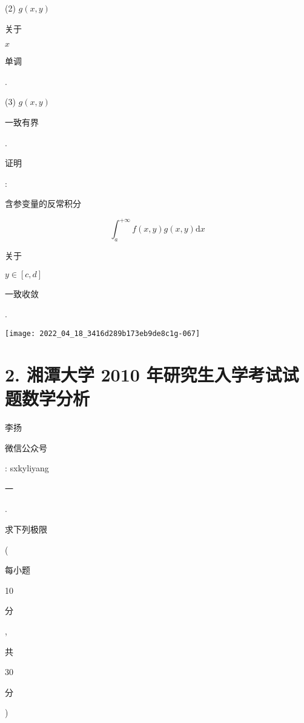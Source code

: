 \documentclass[10pt]{article}
\begin{document}
(2) $g(x, y)$ \begin{CJK}{UTF8}{mj}关于\end{CJK} $x$ \begin{CJK}{UTF8}{mj}单调\end{CJK}.

(3) $g(x, y)$ \begin{CJK}{UTF8}{mj}一致有界\end{CJK}.

\begin{CJK}{UTF8}{mj}证明\end{CJK}: \begin{CJK}{UTF8}{mj}含参变量的反常积分\end{CJK}
$$
\int_{a}^{+\infty} f(x, y) g(x, y) \mathrm{d} x
$$
\begin{CJK}{UTF8}{mj}关于\end{CJK} $y \in[c, d]$ \begin{CJK}{UTF8}{mj}一致收敛\end{CJK}.

\texttt{[image: 2022\_04\_18\_3416d289b173eb9de8c1g-067]}

\section{2. 湘潭大学 2010 年研究生入学考试试题数学分析}
\begin{CJK}{UTF8}{mj}李扬\end{CJK}

\begin{CJK}{UTF8}{mj}微信公众号\end{CJK}: sxkyliyang

\begin{CJK}{UTF8}{mj}一\end{CJK}. \begin{CJK}{UTF8}{mj}求下列极限\end{CJK} (\begin{CJK}{UTF8}{mj}每小题\end{CJK} 10 \begin{CJK}{UTF8}{mj}分\end{CJK}, \begin{CJK}{UTF8}{mj}共\end{CJK} 30 \begin{CJK}{UTF8}{mj}分\end{CJK})
\end{document}
